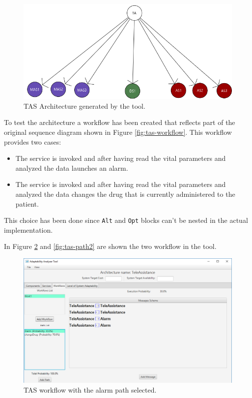 \begin{figure}[h]
	\centerline
	{\includegraphics[scale=0.55]{img/TeleAssistance.png}}
	\caption[TAS Architecture]{TAS Architecture generated by the tool.}
	\label{fig:tas-arch}
\end{figure}

To test the architecture a workflow has been created that reflects part of the original sequence diagram shown in Figure \ref{fig:tas-workflow}. This workflow provides two cases:
\begin{itemize}
	\item The service is invoked and after having read the vital parameters and analyzed the data launches an alarm.
	\item The service is invoked and after having read the vital parameters and analyzed the data changes the drug that is currently administered to the patient.
\end{itemize}

This choice has been done since \texttt{Alt} and \texttt{Opt} blocks can't be nested in the actual implementation.

In Figure \ref{fig:tas-path1} and \ref{fig:tas-path2} are shown the two workflow in the tool.
\begin{figure}[h]
	\centerline
	{\includegraphics[scale=0.55]{img/TeleAssistancePath1.png}}
	\caption[TAS Workflow Path Alarm]{TAS workflow with the alarm path selected.}
	\label{fig:tas-path1}
\end{figure}

